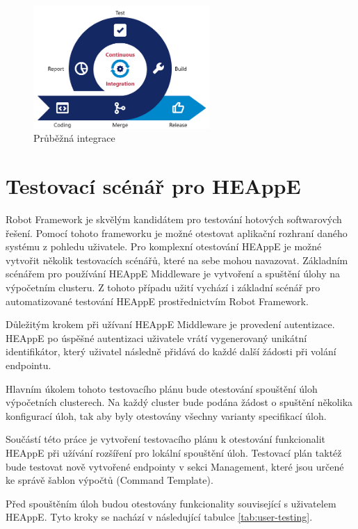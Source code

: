 \begin{figure}[h]
	\centering
	\includegraphics[width=0.6\textwidth]{Figures/cicd.png}
	\caption{Průběžná integrace \cite{cGNjWevJUlEHf7YF}}
	\label{fig:ci}
\end{figure}

\newpage
\section{Testovací scénář pro HEAppE}
Robot Framework je skvělým kandidátem pro testování hotových softwarových řešení. Pomocí tohoto frameworku je možné otestovat aplikační rozhraní daného systému z pohledu uživatele. Pro komplexní otestování HEAppE je možné vytvořit několik testovacích scénářů, které na sebe mohou navazovat. Základním scénářem pro používání HEAppE Middleware je vytvoření a spuštění úlohy na výpočetním clusteru. Z tohoto případu užití vychází i základní scénář pro automatizované testování HEAppE prostřednictvím Robot Framework.

Důležitým krokem při užívaní HEAppE Middleware je provedení autentizace. HEAppE po úspěšné autentizaci uživatele vrátí vygenerovaný unikátní identifikátor, který uživatel následně přidává do každé další žádosti při volání endpointu.

Hlavním úkolem tohoto testovacího plánu bude otestování spouštění úloh výpočetních clusterech. Na každý cluster bude podána žádost o spuštění několika konfigurací úloh, tak aby byly otestovány všechny varianty specifikací úloh.

Součástí této práce je vytvoření testovacího plánu k otestování funkcionalit HEAppE při užívání rozšíření pro lokální spouštění úloh. Testovací plán taktéž bude testovat nově vytvořené endpointy v sekci Management, které jsou určené ke správě šablon výpočtů (Command Template).

\newpage
Před spouštěním úloh budou otestovány funkcionality související s uživatelem HEAppE. Tyto kroky se nachází v následující tabulce \ref{tab:user-testing}.

